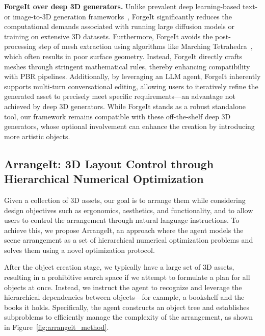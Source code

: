 \noindent\textbf{ForgeIt over deep 3D generators.} Unlike prevalent deep learning-based text- or image-to-3D generation frameworks~\cite{poole2022dreamfusion,lin2023magic3d,hong2023lrm,instant3d2023,zhang2024clay,siddiqui2024meta}, ForgeIt significantly reduces the computational demands associated with running large diffusion models or training on extensive 3D datasets.
%
Furthermore, ForgeIt avoids the post-processing step of mesh extraction using algorithms like Marching Tetrahedra~\cite{doi1991efficient}, which often results in poor surface geometry. Instead, ForgeIt directly crafts meshes through stringent mathematical rules, thereby enhancing compatibility with PBR pipelines. 
%
Additionally, by leveraging an LLM agent, ForgeIt inherently supports multi-turn conversational editing, allowing users to iteratively refine the generated asset to precisely meet specific requirements—an advantage not achieved by deep 3D generators.
%
While ForgeIt stands as a robust standalone tool, our framework remains compatible with these off-the-shelf deep 3D generators, whose optional involvement can enhance the creation by introducing more artistic objects.






\subsection{ArrangeIt: 3D Layout Control through Hierarchical Numerical Optimization}
\label{sec:arrangeit}
Given a collection of 3D assets, our goal is to arrange them while considering design objectives such as ergonomics, aesthetics, and functionality, and to allow users to control the arrangement through natural language instructions. To achieve this, we propose ArrangeIt, an approach where the agent models the scene arrangement as a set of hierarchical numerical optimization problems and solves them using a novel optimization protocol.

After the object creation stage, we typically have a large set of 3D assets, resulting in a prohibitive search space if we attempt to formulate a plan for all objects at once. Instead, we instruct the agent to recognize and leverage the hierarchical dependencies between objects—for example, a bookshelf and the books it holds. Specifically, the agent constructs an object tree and establishes subproblems to efficiently manage the complexity of the arrangement, as shown in Figure~\ref{fig:arrangeit_method}. 


